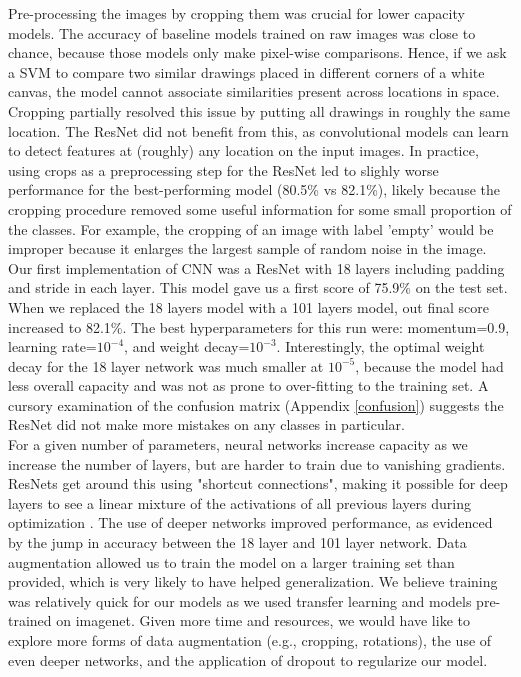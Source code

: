 \documentclass[reqno]{amsart}
\begin{document}
Pre-processing the images by cropping them was crucial for lower capacity models. The accuracy of baseline models trained on raw images was close to chance, because those models only make pixel-wise comparisons. Hence, if we ask a SVM to compare two similar drawings placed in different corners of a white canvas, the model cannot associate similarities present across locations in space. Cropping partially resolved this issue by putting all drawings in roughly the same location. The ResNet did not benefit from this, as convolutional models can learn to detect features at (roughly) any location on the input images. In practice, using crops as a preprocessing step for the ResNet led to slighly worse performance for the best-performing model (80.5\% vs 82.1\%), likely because the cropping procedure removed some useful information for some small proportion of the classes. For example, the cropping of an image with label 'empty' would be improper because it enlarges the largest sample of random noise in the image.
\\

Our first implementation of CNN was a ResNet with 18 layers including padding and stride in each layer. This model gave us a first score of 75.9\% on the test set. When we replaced the 18 layers model with a 101 layers model, out final score increased to  82.1\%. The best hyperparameters for this run were: momentum=0.9, learning rate=$10^{-4}$, and weight decay=$10^{-3}$. Interestingly, the optimal weight decay for the 18 layer network was much smaller at $10^{-5}$, because the model had less overall capacity and was not as prone to over-fitting to the training set. A cursory examination of the confusion matrix (Appendix \ref{confusion}) suggests the ResNet did not make more mistakes on any classes in particular. \\

For a given number of parameters, neural networks increase capacity as we increase the number of layers\cite{DL}, but are harder to train due to vanishing gradients. ResNets get around this using "shortcut connections", making it possible for deep layers to see a linear mixture of the activations of all previous layers during optimization \cite{He}. The use of deeper networks improved performance, as evidenced by the jump in accuracy between the 18 layer and 101 layer network. Data augmentation allowed us to train the model on a larger training set than provided, which is very likely to have helped generalization. We believe training was relatively quick for our models as we used transfer learning and models pre-trained on imagenet. Given more time and resources, we would have like to explore more forms of data augmentation (e.g., cropping, rotations), the use of even deeper networks, and the application of dropout to regularize our model. \\
\end{document}
